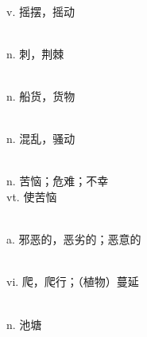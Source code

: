 \documentclass[a4paper, 11pt]{ctexart}
\begin{document}
\begin{multicols*}{2}
\begin{description}[leftmargin=0.5cm]
\item[sway] \hfill \\ v. 摇摆，摇动

\item[thorn] \hfill \\ n. 刺，荆棘

\item[cargo] \hfill \\ n. 船货，货物

\item[turmoil] \hfill \\ n. 混乱，骚动

\item[distress] \hfill \\ n. 苦恼；危难；不幸 \\ vt. 使苦恼

\item[wicked] \hfill \\ a. 邪恶的，恶劣的；恶意的

\item[creep] \hfill \\ vi. 爬，爬行；（植物）蔓延

\item[pond] \hfill \\ n. 池塘

    \end{description}
\end{multicols*}

\clearpage
\end{document}
